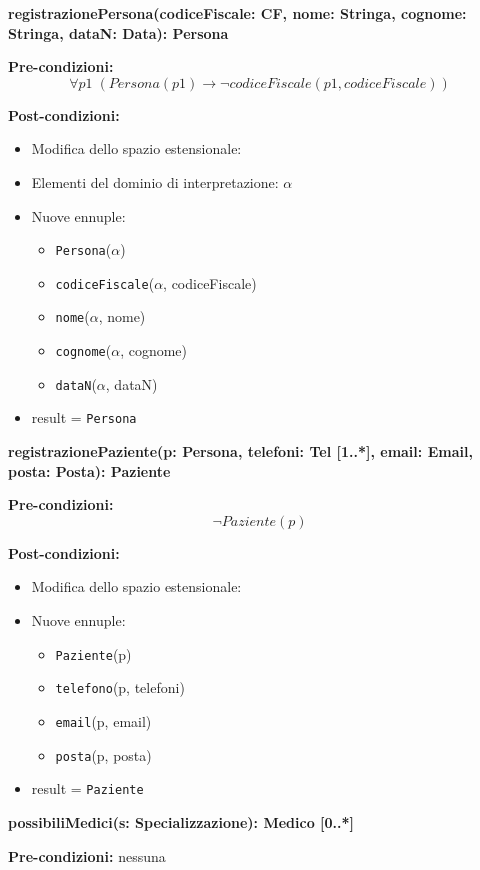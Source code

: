 \documentclass{article}
\begin{document}
\textbf{registrazionePersona(codiceFiscale: CF, nome: Stringa, cognome: Stringa, dataN: Data): Persona}

\textbf{Pre-condizioni:} 
\[
\forall p1 \; (Persona(p1) \rightarrow \neg codiceFiscale(p1,codiceFiscale))
\]

\textbf{Post-condizioni:}
\begin{itemize}
    \item Modifica dello spazio estensionale:
    \item Elementi del dominio di interpretazione: \( \alpha \)
    \item Nuove ennuple:
    \begin{itemize}
        \item \texttt{Persona}(\(\alpha\))
        \item \texttt{codiceFiscale}(\(\alpha\), codiceFiscale)
        \item \texttt{nome}(\(\alpha\), nome)
        \item \texttt{cognome}(\(\alpha\), cognome)
        \item \texttt{dataN}(\(\alpha\), dataN)
    \end{itemize}
    \item result = \texttt{Persona}
\end{itemize}

\textbf{registrazionePaziente(p: Persona, telefoni: Tel [1..*], email: Email, posta: Posta): Paziente}

\textbf{Pre-condizioni:} 
\[
\neg Paziente(p)
\]

\textbf{Post-condizioni:}
\begin{itemize}
    \item Modifica dello spazio estensionale:
    \item Nuove ennuple:
    \begin{itemize}
        \item \texttt{Paziente}(p)
        \item \texttt{telefono}(p, telefoni)
        \item \texttt{email}(p, email)
        \item \texttt{posta}(p, posta)
    \end{itemize}
    \item result = \texttt{Paziente}
\end{itemize}

\textbf{possibiliMedici(s: Specializzazione): Medico [0..*]}

\textbf{Pre-condizioni:} nessuna
\end{document}
